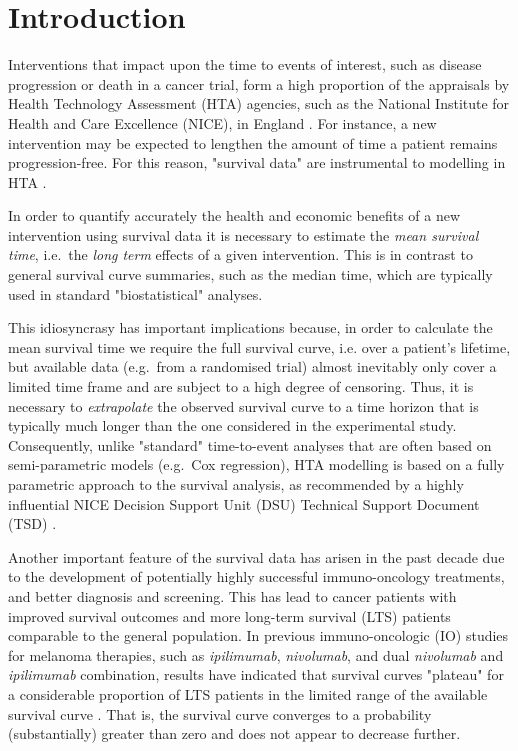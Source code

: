 \documentclass[AMA,STIX1COL]{WileyNJD-v2}
\begin{document}

\section{Introduction}\label{sec:intro}

Interventions that impact upon the time to events of interest, such as disease progression or death in a cancer trial, form a high proportion of the appraisals by Health Technology Assessment (HTA) agencies, such as the National Institute for Health and Care Excellence (NICE), in England \citep{Latimer2011}.
For instance, a new intervention may be expected to lengthen the amount of time a patient remains progression-free. For this reason, "survival data" are instrumental to modelling in HTA \cite{Demiris2006, Jackson2010}.


In order to quantify accurately the health and economic benefits of a new intervention using survival data it is necessary to estimate the {\it mean survival time}, i.e.~the \textit{long term} effects of a given intervention.
This is in contrast to general survival curve summaries, such as the median time, which are typically used in standard "biostatistical" analyses.

This idiosyncrasy has important implications because, in order to calculate the mean survival time we require the full survival curve, i.e. over a patient's lifetime, but available data (e.g.~from a randomised trial) almost inevitably only cover a limited time frame and are subject to a high degree of censoring.
Thus, it is necessary to \textit{extrapolate} the observed survival curve to a time horizon that is typically much longer than the one considered in the experimental study.
Consequently, unlike "standard" time-to-event analyses that are often based on semi-parametric models (e.g.~Cox regression), HTA modelling is based on a fully parametric approach to the survival analysis, as recommended by a highly influential NICE Decision Support Unit (DSU) Technical Support Document (TSD) \citep{Latimer2011}.

Another important feature of the survival data has arisen in the past decade due to the development of potentially highly successful immuno-oncology treatments, and better diagnosis and screening.
This has lead to cancer patients with improved survival outcomes and more long-term survival (LTS) patients comparable to the general population.
In previous immuno-oncologic (IO) studies for melanoma therapies, such as {\it ipilimumab}, {\it nivolumab}, and dual {\it nivolumab} and {\it ipilimumab} combination,
results have indicated that survival curves "plateau" for a considerable proportion of LTS patients in the limited range of the available survival curve \citep{Wolchok2017, Larkin2019}.
That is, the survival curve converges to a probability (substantially) greater than zero and does not appear to decrease further.
\end{document}
